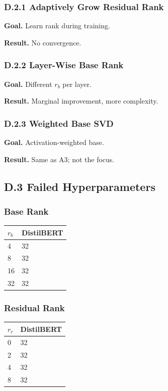 \subsubsection{D.2.1 Adaptively Grow Residual Rank}

\textbf{Goal.} Learn rank during training.

\textbf{Result.} No convergence.

\subsubsection{D.2.2 Layer-Wise Base Rank}

\textbf{Goal.} Different $r_b$ per layer.

\textbf{Result.} Marginal improvement, more complexity.

\subsubsection{D.2.3 Weighted Base SVD}

\textbf{Goal.} Activation-weighted base.

\textbf{Result.} Same as A3; not the focus.

\subsection{D.3 Failed Hyperparameters}

\subsubsection{Base Rank}

\begin{table}[H]
\centering
\small
\begin{tabular}{ll}
\toprule
\textbf{$r_b$} & \textbf{DistilBERT} \\
\midrule
4 & 32 \\
8 & 32 \\
16 & 32 \\
32 & 32 \\
\bottomrule
\end{tabular}
\end{table}

\subsubsection{Residual Rank}

\begin{table}[H]
\centering
\small
\begin{tabular}{ll}
\toprule
\textbf{$r_r$} & \textbf{DistilBERT} \\
\midrule
0 & 32 \\
2 & 32 \\
4 & 32 \\
8 & 32 \\
\bottomrule
\end{tabular}
\end{table}

